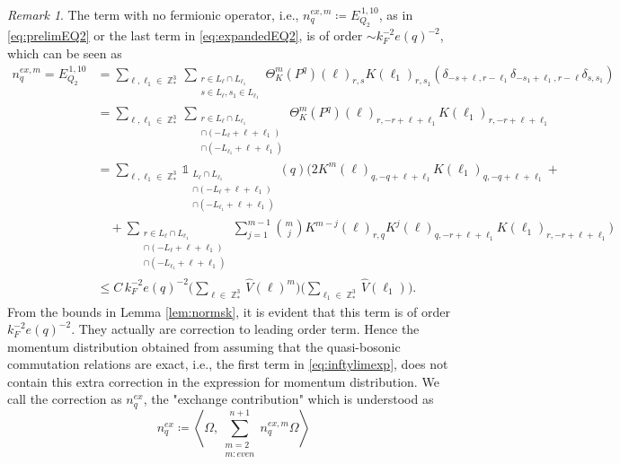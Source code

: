 \documentclass[sn-mathphys, Numbered ,a4paper]{sn-jnl}%
\DeclareMathOperator{\Z}{\mathbb{Z}}
\newcommand{\eva}[1]{\left\langle #1 \right\rangle}
\theoremstyle{plain}
\theoremstyle{definition}
\theoremstyle{remark}
\newtheorem{remark}[theorem]{Remark}
\theoremstyle{plain}
\theoremstyle{definition}
\theoremstyle{remark}
\begin{document}
\begin{remark} \label{rem:leadorder}
	The term with no fermionic operator, i.e., $n_q^{ex,m}\coloneq E^{\,1,10}_{Q_2}$, as in \eqref{eq:prelimEQ2} or the last term in \eqref{eq:expandedEQ2}, is of order $\sim{k_F^{-2}e(q)^{-2}}$, which can be seen as 
	\begin{align}
		n_q^{ex,m}=E^{\,1,10}_{Q_2} &= \sum\limits_{\ell,\ell_1 \in \Z^3_*}\sum\limits_{\substack{r\in L_{\ell} \cap L_{\ell_1}\\ s \in L_{\ell},s_1\in L_{\ell_1}}} \!\!\!\Theta^m_{K}(P^q)(\ell)_{r,s}K(\ell_1)_{r,s_1}(\delta_{-s+\ell,r-\ell_1}\delta_{-s_1+\ell_1,r-\ell}\delta_{s,s_1}) \nonumber\\
		&= \sum\limits_{\ell,\ell_1 \in \Z^3_*}\sum\limits_{\substack{r\in L_{\ell} \cap L_{\ell_1}\\ \cap (-L_{\ell}+\ell+\ell_1) \\ \cap (-L_{\ell_1}+\ell+\ell_1 )}} \!\!\!\Theta^m_{K}(P^q)(\ell)_{r,-r+\ell+\ell_1}K(\ell_1)_{r,-r+\ell+\ell_1}\nonumber\\
		&= \sum\limits_{\ell,\ell_1 \in \Z^3_*}\mathds{1}_{\substack{ L_{\ell} \cap L_{\ell_1}\\ \cap (-L_{\ell}+\ell+\ell_1) \\ \cap (-L_{\ell_1}+\ell+\ell_1 )}}(q)\Bigg( 2 K^m(\ell )_{q,-q+\ell+\ell_1}K(\ell_1)_{q,-q+\ell+\ell_1}+ \nonumber \\  &\quad +\sum\limits_{\substack{r\in L_{\ell} \cap L_{\ell_1}\\ \cap (-L_{\ell}+\ell+\ell_1) \\ \cap (-L_{\ell_1}+\ell+\ell_1 )}} \sum\limits_{j=1}^{m-1} {{m}\choose j}K^{m-j}(\ell)_{r,q} K^{j}(\ell)_{q,-r+\ell+\ell_1} K(\ell_1)_{r,-r+\ell+\ell_1} \Bigg)\nonumber\\
		&\leq C\,  k_{F}^{-2} e(q)^{-2} \Bigg(\sum\limits_{\ell \in \Z^3_*} \hat{V}(\ell)^m\Bigg)\Bigg( \sum\limits_{\ell_1 \in \Z^3_*} \hat{V}(\ell_1) \Bigg).
	\end{align} 
	From the bounds in Lemma \ref{lem:normsk}, it is evident that this term is of order $k_F^{-2}e(q)^{-2}$.
	They actually are correction to leading order term. Hence the momentum distribution obtained from assuming that the quasi-bosonic commutation relations are exact, i.e., the first term in \eqref{eq:inftylimexp}, does not contain this extra correction in the expression for momentum distribution. We call the correction as $n_q^{ex}$, the "exchange contribution" which is understood as 
	\begin{equation}
		n_q^{ex} \coloneq \eva{\Omega,\sum\limits_{\substack{m = 2\\m:even}}^{n+1}n_q^{ex,m}\Omega} 
	\end{equation}
\end{remark}
\end{document}
